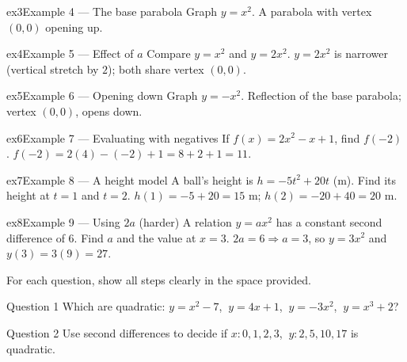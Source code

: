 \documentclass[11pt]{article}
\begin{document}
\begin{example}{ex3}{Example 4 --- The base parabola}
Graph $y=x^2$.
\soln A parabola with vertex $(0,0)$ opening up.
\end{example}

\begin{example}{ex4}{Example 5 --- Effect of $a$}
Compare $y=x^2$ and $y=2x^2$.
\soln $y=2x^2$ is narrower (vertical stretch by $2$); both share vertex $(0,0)$.
\end{example}

\begin{example}{ex5}{Example 6 --- Opening down}
Graph $y=-x^2$.
\soln Reflection of the base parabola; vertex $(0,0)$, opens down.
\end{example}

\begin{example}{ex6}{Example 7 --- Evaluating with negatives}
If $f(x)=2x^2-x+1$, find $f(-2)$.
\soln $f(-2)=2(4)-(-2)+1=8+2+1=11.$
\end{example}

\begin{example}{ex7}{Example 8 --- A height model}
A ball's height is $h=-5t^2+20t$ (m). Find its height at $t=1$ and $t=2$.
\soln $h(1)=-5+20=15$ m; $h(2)=-20+40=20$ m.
\end{example}

\begin{example}{ex8}{Example 9 --- Using $2a$ (harder)}
A relation $y=ax^2$ has a constant second difference of $6$. Find $a$ and the value at $x=3$.
\soln $2a=6\Rightarrow a=3$, so $y=3x^2$ and $y(3)=3(9)=27.$
\end{example}

\clearpage
{}
For each question, show all steps clearly in the space provided.

\begin{qbox}{Question 1}
Which are quadratic: $y=x^2-7$, $\ y=4x+1$, $\ y=-3x^2$, $\ y=x^3+2$?\workspace{2.0cm}
\end{qbox}

\begin{qbox}{Question 2}
Use second differences to decide if $x:0,1,2,3$, $\ y:2,5,10,17$ is quadratic.\workspace{2.4cm}
\end{qbox}
\end{document}
